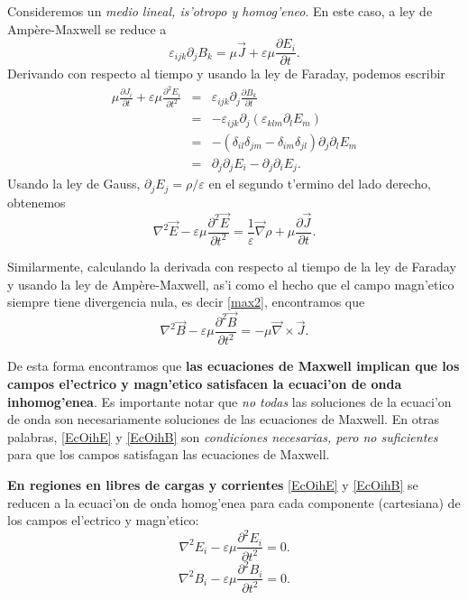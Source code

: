 Consideremos un \textit{medio lineal, is'otropo y homog'eneo}. En este caso, a ley de Amp\`ere-Maxwell se reduce a
\begin{equation}
\varepsilon_{ijk}\partial_jB_k=\mu\vec{J}+\varepsilon\mu\frac{\partial E_i}{\partial t}.
\end{equation}
Derivando con respecto al tiempo y usando la ley de Faraday, podemos escribir
\begin{eqnarray}
\mu \frac{\partial J_i}{\partial t}+\varepsilon\mu\frac{\partial^2E_i}{\partial t^2}
&=&\varepsilon_{ijk}\partial_j\frac {\partial B_k}{\partial t} \\
&=&-\varepsilon_{ijk}\partial_j\left(\varepsilon_{klm}\partial_lE_m \right)\\
&=&-\left( \delta_{il}\delta_{jm}-\delta_{im}\delta_{jl}\right)
\partial_j\partial_lE_m\\
&=&\partial_j\partial_jE_i-\partial_j\partial_iE_j.
\end{eqnarray}
Usando la ley de Gauss, $\partial_jE_j=\rho/\varepsilon$ en el segundo t'ermino del lado derecho, obtenemos
\begin{equation}\label{EcOihE}
\boxed{\nabla^2\vec{E}-\varepsilon\mu\frac{\partial^2\vec{E}}{\partial t^2}=\frac{1}{\varepsilon}\vec\nabla\rho+\mu\frac{\partial\vec{J}}{\partial t}.}
\end{equation}

Similarmente, calculando la derivada con respecto al tiempo de la ley de Faraday y usando la ley de Amp\`ere-Maxwell, as'i como el hecho que el campo magn'etico siempre tiene divergencia nula, es decir \eqref{max2}, encontramos que
\begin{equation}\label{EcOihB}
\boxed{\nabla^2\vec{B}-\varepsilon\mu\frac{\partial^2\vec{B}}{\partial t^2}=-\mu\vec\nabla\times\vec{J}.}
\end{equation}

De esta forma encontramos que \textbf{las ecuaciones de Maxwell implican que los
campos el'ectrico y magn'etico satisfacen la ecuaci'on de onda inhomog'enea}. Es importante notar que \textit{no todas} las soluciones de la ecuaci'on de onda son necesariamente soluciones de las ecuaciones de Maxwell. En otras palabras, \eqref{EcOihE} y \eqref{EcOihB} son \textit{condiciones necesarias, pero no suficientes} para que los campos satisfagan las ecuaciones de Maxwell.

\textbf{En regiones en libres de cargas y corrientes} \eqref{EcOihE} y \eqref{EcOihB} se reducen a la ecuaci'on de onda homog'enea para cada componente (cartesiana) de los campos el'ectrico y magn'etico:
\begin{equation}\label{econdaE}
\boxed{\nabla^2E_i-\varepsilon\mu\frac{\partial^2E_i}{\partial t^2}=0.}
\end{equation}
\begin{equation}
\boxed{\nabla^2B_i-\varepsilon\mu\frac{\partial^2B_i}{\partial t^2}=0.}
\label{econdaB}
\end{equation}




